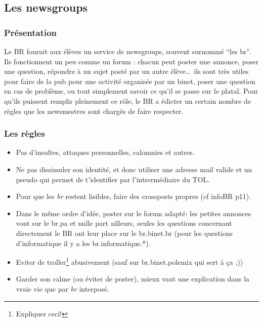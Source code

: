 \subsection{Les newsgroups}
\label{newsgroups}
\subsubsection{Pr\'esentation}
Le BR fournit aux \'el\`eves un service de newsgroups, souvent surnomm\'e ``les br''.
Ils fonctionnent un peu comme un forum : chacun peut poster une annonce, poser une question,
 r\'epondre \`a un sujet post\'e par un autre \'el\`eve\ldots\ 
ils sont tr\`es utiles pour faire de la pub pour une activit\'e organis\'ee par un binet,
poser une question en cas de probl\`eme, ou tout simplement savoir ce qu'il se passe sur le platal.
Pour qu'ils puissent remplir pleinement ce r\^ole, le BR a \'edicter un certain nombre de r\`egles
que les newsmestres sont charg\'es de faire respecter.

\subsubsection{Les r\`egles}
\begin{itemize}
 \item Pas d'insultes, attaques personnelles, calomnies et autres.
 \item Ne pas dissimuler son identit\'e, et donc utiliser une adresse mail valide
       et un pseudo qui permet de t'identifier par l'intrerm\'ediaire du TOL.
 \item Pour que les {\it br} restent lisibles, faire des crossposts propres (cf infoBR p11).
 \item Dans le m\^eme ordre d'id\'ee, poster sur le forum adapt\'e:
       les petites annonces vont sur le br.pa et nulle part ailleurs,
       seules les questions concernant directement le BR ont leur place sur le br.binet.br
       (pour les questions d'informatique il y a les br.informatique.*).
 \item Eviter de troller\footnote{Expliquer ceci!} abusivement (sauf sur br.binet.polemix qui sert \`a \c{c}a ;))
 \item Garder son calme (ou \'eviter de poster), mieux vaut une explication dans la vraie vie
       que par {\it br} interpos\'e.
\end{itemize}

